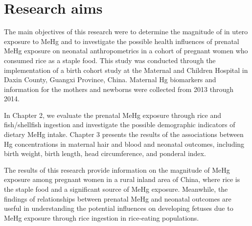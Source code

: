 \section{Research aims}

The main objectives of this research were to determine the magnitude of in utero exposure to MeHg and to investigate the possible health influences of prenatal MeHg exposure on neonatal anthropometrics in a cohort of pregnant women who consumed rice as a staple food. This study was conducted through the implementation of a birth cohort study at the Maternal and Children Hospital in Daxin County, Guangxi Province, China. Maternal Hg biomarkers and information for the mothers and newborns were collected from 2013 through 2014.

In Chapter 2, we evaluate the prenatal MeHg exposure through rice and fish/shellfish ingestion and investigate the possible demographic indicators of dietary MeHg intake. Chapter 3 presents the results of the associations between Hg concentrations in maternal hair and blood and neonatal outcomes, including birth weight, birth length, head circumference, and ponderal index.

The results of this research provide information on the magnitude of MeHg exposure among pregnant women in a rural inland area of China, where rice is the staple food and a significant source of MeHg exposure. Meanwhile, the findings of relationships between prenatal MeHg and neonatal outcomes are useful in understanding the potential influences on developing fetuses due to MeHg exposure through rice ingestion in rice-eating populations. 


